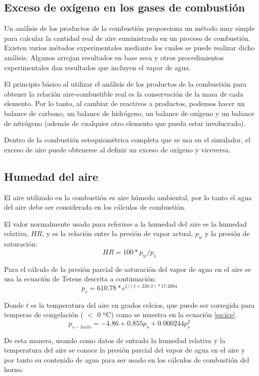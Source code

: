 \subsection{Exceso de oxígeno en los gases de combustión}
\par Un análisis de los productos de la combustión proporciona un método muy simple para calcular la cantidad real de aire suministrado en un proceso de combustión. Existen varios métodos experimentales mediante los cuales se puede realizar dicho análisis. Algunos arrojan resultados en base seca y otros procedimientos experimentales dan resultados que incluyen el vapor de agua. 
\par El principio básico al utilizar el análisis de los productos de la combustión para obtener la relación aire-combustible real es la conservación de la masa de cada elemento. Por lo tanto, al cambiar de reactivos a productos, podemos hacer un balance de carbono, un balance de hidrógeno, un balance de oxígeno y un balance de nitrógeno (además de cualquier otro elemento que pueda estar involucrado).
\par Dentro de la combustión estequiométrica completa que se usa en el simulador, el exceso de aire puede obtenerse al definir un exceso de oxígeno y viceversa. 

\subsection{Humedad del aire}
\par El aire utilizado en la combustión es aire húmedo ambiental, por lo tanto el agua del aire debe ser considerada en los cálculos de combustión.
\par El valor normalmente usado para referirse a la humedad del aire es la humedad relativa, $HR$, y es la relación entre la presión de vapor actual, $p_w$ y la presión de saturación:
\begin{equation}
    HR = 100 * p_w/p_s
\end{equation}
\par Para el cálculo de la presión parcial de saturación del vapor de agua en el aire se usa la ecuación de Tetens \cite{bib:tetens} descrita a continuación:
\begin{equation}
    p_s = 610.78 * e^{t/(t +238.3)*17.2694}
\end{equation}
\par Donde $t$ es la temperatura del aire en grados celcios, que puede ser corregida para temperas de congelación ( $<$ 0 ºC) como se muestra en la ecuación \ref{eq:ice}.
\begin{equation}
\label{eq:ice}
    p_{s-hielo} = -4.86 + 0.855p_s + 0.000244p_s^2
\end{equation}
\par De esta manera, usando como datos de entrada la humedad relativa y la temperatura del aire se conoce la presión parcial del vapor de agua en el aire y por tanto su contenido de agua para ser usado en los cálculos de combustión del horno.

